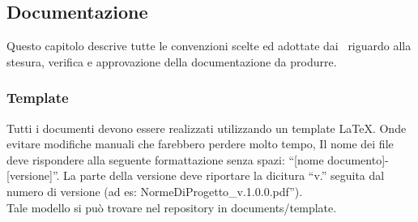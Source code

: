 {\subsection{Documentazione}{
Questo capitolo descrive tutte le convenzioni scelte ed adottate dai \gruppo\ riguardo alla stesura, verifica e approvazione della documentazione da produrre.
\subsubsection{Template} 
		Tutti i documenti devono essere realizzati utilizzando un template \LaTeX. Onde evitare modifiche manuali che farebbero perdere molto tempo, 
		Il nome dei file deve rispondere alla seguente formattazione senza spazi: “[nome documento]-[versione]”. La parte della versione deve riportare la dicitura “v.” seguita dal numero di versione (ad es: NormeDiProgetto\_v.1.0.0.pdf”).\\
 		Tale modello si può trovare nel repository in documents/template.
	\label{sec:docs}
}}
